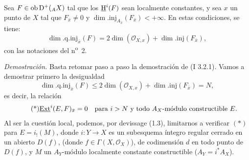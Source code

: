 Sea $F\in\operatorname{ob}\mathrm{D}^+({}_A X)$ tal que los $\underline{\mathrm H}^i(F)$ sean localmente constantes, y sea $x$ un punto de $X$ tal que $F_{\bar{x}}\neq0$ y $\dim.\mathrm{inj}_{A_{\bar{x}}}(F_{\bar{x}})<+\infty$. En estas condiciones, se tiene:
\[
        \dim.\mathrm{q.inj}_{\bar{x}}(F)=2\dim(\mathcal{O}_{X,x})+\dim.\mathrm{inj}(F_{\bar{x}}),
\]
con las notaciones del n\textsuperscript{o}~2.

\emph{Demostración.} Basta retomar paso a paso la demostración de (I 3.2.1). Vamos a demostrar primero la desigualdad
\[
        \dim.\mathrm{q.inj}_{\bar{x}}(F)\leq 2\dim(\mathcal{O}_{X,x})+\dim.\mathrm{inj}(F_{\bar{x}})=N,
\]
es decir, la relación
\begin{equation}\tag{*}
        \underline{\operatorname{Ext}}^{i}(E,F)_{\bar{x}}=0\quad\hbox{para } i>N\hbox{ y todo }A_X\hbox{-módulo constructible }E.
\end{equation}
Al ser la cuestión local, podemos, por devissage (1.3), limitarnos a verificar $(*)$ para $E=i_!(M)$, donde $i:Y\to X$ es un subesquema íntegro regular cerrado en un abierto $D(f)$, (donde $f\in\Gamma(X,\mathcal{O}_X)$), de codimensión $d$ en todo punto de $D(f)$, y $M$ un $A_Y$-módulo localmente constante constructible ($A_Y=i^*A_X$).

